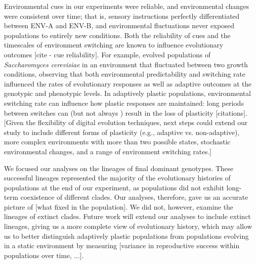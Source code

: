 Environmental cues in our experiments were reliable, and environmental changes were consistent over time; that is, sensory instructions perfectly differentiated between ENV-A and ENV-B, and environmental fluctuations never exposed populations to entirely new conditions.
Both the reliability of cues and the timescales of environment switching are known to influence evolutionary outcomes \citep{li_digital_2004,boyer_adaptation_2021} [cite - cue reliability].
For example, \cite{boyer_adaptation_2021} evolved populations of \textit{Saccharomyces cerevisiae} in an environment that fluctuated between two growth conditions, observing that both environmental predictability and switching rate influenced the rates of evolutionary responses as well as adaptive outcomes at the genotypic and phenotypic levels. %
In adaptively plastic populations, environmental switching rate can influence how plastic responses are maintained: long periods between switches can (but not always \citep{grant_maintenance_2020}) result in the loss of plasticity [citations].
[Given the flexibility of digital evolution techniques, next steps could extend our study to include different forms of plasticity (e.g., adaptive vs. non-adaptive), more complex environments with more than two possible states, stochastic environmental changes, and a range of environment switching rates.]

We focused our analyses on the lineages of final dominant genotypes.
These successful lineages represented the majority of the evolutionary histories of populations at the end of our experiment, as populations did not exhibit long-term coexistence of different clades.
Our analyses, therefore, gave us an accurate picture of [what fixed in the population].
We did not, however, examine the lineages of extinct clades.
Future work will extend our analyses to include extinct lineages, giving us a more complete view of evolutionary history, which may allow us to better distinguish adaptively plastic populations from populations evolving in a static environment by measuring [variance in reproductive success within populations over time, ...].


